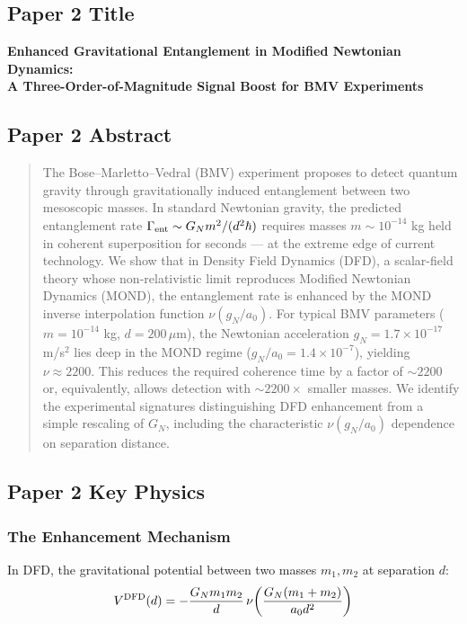 \documentclass[11pt,a4paper]{article}
\begin{document}
\subsection{Paper 2 Title}

\begin{center}
\large\textbf{Enhanced Gravitational Entanglement in Modified Newtonian Dynamics:\\A Three-Order-of-Magnitude Signal Boost for BMV Experiments}
\end{center}

\subsection{Paper 2 Abstract}

\begin{quote}
The Bose--Marletto--Vedral (BMV) experiment proposes to detect quantum gravity through gravitationally induced entanglement between two mesoscopic masses. In standard Newtonian gravity, the predicted entanglement rate $\Gamma_{\rm ent} \sim G_N m^2/(d^2\hbar)$ requires masses $m \sim 10^{-14}$ kg held in coherent superposition for seconds --- at the extreme edge of current technology. We show that in Density Field Dynamics (DFD), a scalar-field theory whose non-relativistic limit reproduces Modified Newtonian Dynamics (MOND), the entanglement rate is enhanced by the MOND inverse interpolation function $\nu(g_N/a_0)$. For typical BMV parameters ($m = 10^{-14}$ kg, $d = 200\,\mu$m), the Newtonian acceleration $g_N = 1.7\times10^{-17}$ m/s$^2$ lies deep in the MOND regime ($g_N/a_0 = 1.4\times10^{-7}$), yielding $\nu \approx 2200$. This reduces the required coherence time by a factor of $\sim 2200$ or, equivalently, allows detection with $\sim 2200\times$ smaller masses. We identify the experimental signatures distinguishing DFD enhancement from a simple rescaling of $G_N$, including the characteristic $\nu(g_N/a_0)$ dependence on separation distance.
\end{quote}

\subsection{Paper 2 Key Physics}

\subsubsection{The Enhancement Mechanism}

In DFD, the gravitational potential between two masses $m_1, m_2$ at separation $d$:
\begin{equation}
V^{\rm DFD}(d) = -\frac{G_N m_1 m_2}{d}\,\nu\!\left(\frac{G_N(m_1+m_2)}{a_0 d^2}\right)
\end{equation}
\end{document}

